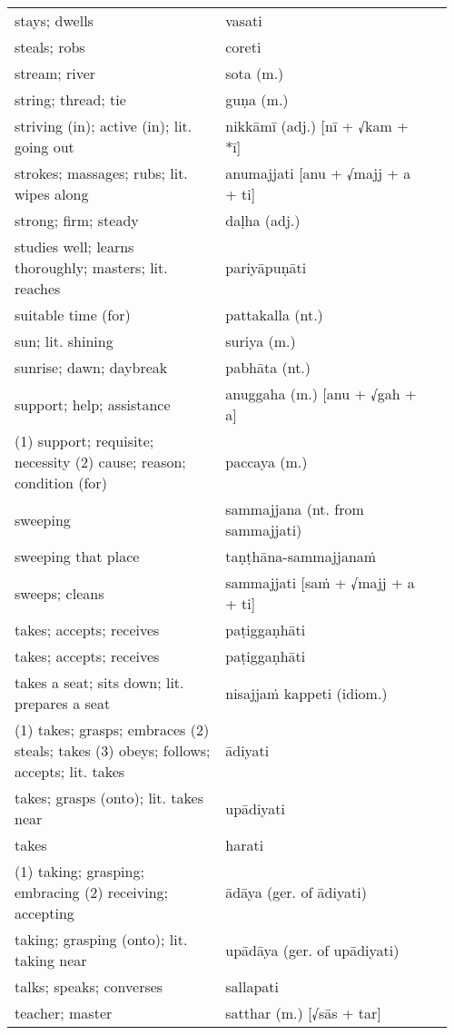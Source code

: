 \documentclass[a5paper]{memoir}
\begin{document}
\begin{longtable}{L{0.48\linewidth} L{0.48\linewidth} H}
stays; dwells & vasati & \\[0pt]
steals; robs & coreti & \\[0pt]
stream; river & sota (m.) & \\[0pt]
string; thread; tie & guṇa (m.) & \\[0pt]
striving (in); active (in); lit. going out & nikkāmī (adj.) [nī + √kam + *ī] & \\[0pt]
strokes; massages; rubs; lit. wipes along & anumajjati [anu + √majj + a + ti] & \\[0pt]
strong; firm; steady & daḷha (adj.) & \\[0pt]
studies well; learns thoroughly; masters; lit. reaches & pariyāpuṇāti & \\[0pt]
suitable time (for) & pattakalla (nt.) & \\[0pt]
sun; lit. shining & suriya (m.) & \\[0pt]
sunrise; dawn; daybreak & pabhāta (nt.) & \\[0pt]
support; help; assistance & anuggaha (m.) [anu + √gah + a] & \\[0pt]
(1) support; requisite; necessity (2) cause; reason; condition (for) & paccaya (m.) & \\[0pt]
sweeping & sammajjana (nt. from sammajjati) & \\[0pt]
sweeping that place & taṇṭhāna-sammajjanaṁ & \\[0pt]
sweeps; cleans & sammajjati [saṁ + √majj + a + ti] & \\[0pt]
takes; accepts; receives & paṭiggaṇhāti & \\[0pt]
takes; accepts; receives & paṭiggaṇhāti & \\[0pt]
takes a seat; sits down; lit. prepares a seat & nisajjaṁ kappeti (idiom.) & \\[0pt]
(1) takes; grasps; embraces (2) steals; takes (3) obeys; follows; accepts; lit. takes & ādiyati & \\[0pt]
takes; grasps (onto); lit. takes near & upādiyati & \\[0pt]
takes & harati & \\[0pt]
(1) taking; grasping; embracing (2) receiving; accepting & ādāya (ger. of ādiyati) & \\[0pt]
taking; grasping (onto); lit. taking near & upādāya (ger. of upādiyati) & \\[0pt]
talks; speaks; converses & sallapati & \\[0pt]
teacher; master & satthar (m.) [√sās + tar] & \\[0pt]

\end{longtable}
\end{document}
